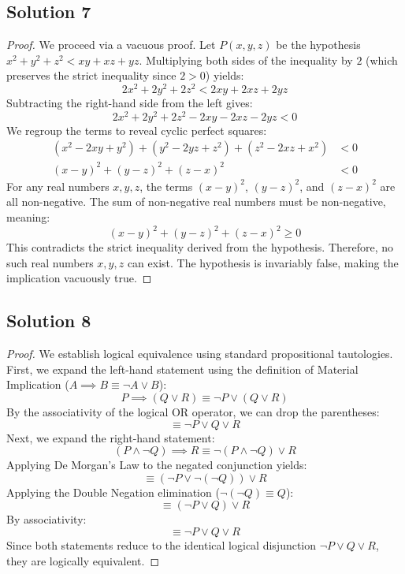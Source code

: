 \documentclass[12pt]{article}
\begin{document}
\subsection*{Solution 7}
\begin{proof}
We proceed via a vacuous proof. Let $P(x, y, z)$ be the hypothesis $x^2 + y^2 + z^2 < xy + xz + yz$. Multiplying both sides of the inequality by $2$ (which preserves the strict inequality since $2 > 0$) yields:
\[ 2x^2 + 2y^2 + 2z^2 < 2xy + 2xz + 2yz \]
Subtracting the right-hand side from the left gives:
\[ 2x^2 + 2y^2 + 2z^2 - 2xy - 2xz - 2yz < 0 \]
We regroup the terms to reveal cyclic perfect squares:
\begin{align*}
    (x^2 - 2xy + y^2) + (y^2 - 2yz + z^2) + (z^2 - 2xz + x^2) &< 0 \\
    (x - y)^2 + (y - z)^2 + (z - x)^2 &< 0
\end{align*}
For any real numbers $x, y, z$, the terms $(x - y)^2$, $(y - z)^2$, and $(z - x)^2$ are all non-negative. The sum of non-negative real numbers must be non-negative, meaning:
\[ (x - y)^2 + (y - z)^2 + (z - x)^2 \ge 0 \]
This contradicts the strict inequality derived from the hypothesis. Therefore, no such real numbers $x, y, z$ can exist. The hypothesis is invariably false, making the implication vacuously true.
\end{proof}

\subsection*{Solution 8}
\begin{proof}
We establish logical equivalence using standard propositional tautologies. First, we expand the left-hand statement using the definition of Material Implication ($A \implies B \equiv \neg A \lor B$):
\[ P \implies (Q \lor R) \equiv \neg P \lor (Q \lor R) \]
By the associativity of the logical OR operator, we can drop the parentheses:
\[ \equiv \neg P \lor Q \lor R \]
Next, we expand the right-hand statement:
\[ (P \land \neg Q) \implies R \equiv \neg(P \land \neg Q) \lor R \]
Applying De Morgan's Law to the negated conjunction yields:
\[ \equiv (\neg P \lor \neg(\neg Q)) \lor R \]
Applying the Double Negation elimination ($\neg(\neg Q) \equiv Q$):
\[ \equiv (\neg P \lor Q) \lor R \]
By associativity:
\[ \equiv \neg P \lor Q \lor R \]
Since both statements reduce to the identical logical disjunction $\neg P \lor Q \lor R$, they are logically equivalent.
\end{proof}
\end{document}
